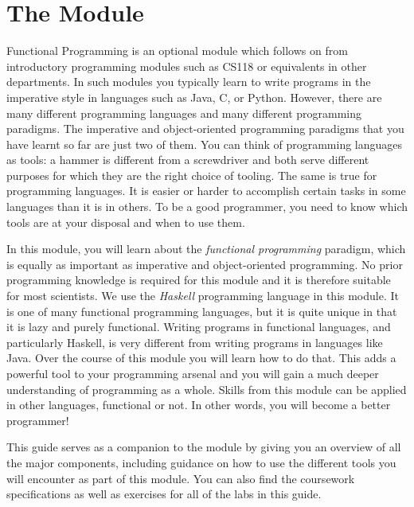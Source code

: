
\chapter{The Module}

Functional Programming is an optional module which follows on from introductory programming modules such as CS118 or equivalents in other departments. In such modules you typically learn to write programs in the imperative style in languages such as Java, C, or Python. However, there are many different programming languages and many different programming paradigms. The imperative and object-oriented programming paradigms that you have learnt so far are just two of them. You can think of programming languages as tools: a hammer is different from a screwdriver and both serve different purposes for which they are the right choice of tooling. The same is true for programming languages. It is easier or harder to accomplish certain tasks in some languages than it is in others. To be a good programmer, you need to know which tools are at your disposal and when to use them.

In this module, you will learn about the \emph{functional programming} paradigm, which is equally as important as imperative and object-oriented programming. No prior programming knowledge is required for this module and it is therefore suitable for most scientists. We use the \emph{Haskell} programming language in this module. It is one of many functional programming languages, but it is quite unique in that it is lazy and purely functional. Writing programs in functional languages, and particularly Haskell, is very different from writing programs in languages like Java. Over the course of this module you will learn how to do that. This adds a powerful tool to your programming arsenal and you will gain a much deeper understanding of programming as a whole. Skills from this module can be applied in other languages, functional or not. In other words, you will become a better programmer!

This guide serves as a companion to the module by giving you an overview of all the major components, including guidance on how to use the different tools you will encounter as part of this module. You can also find the coursework specifications as well as exercises for all of the labs in this guide.

